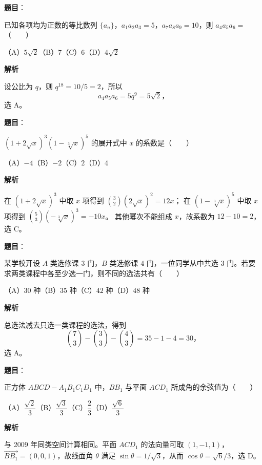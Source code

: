\begin{answer}

\textbf{题目}：

已知各项均为正数的等比数列 $\{a_n\}$，$a_1a_2a_3=5$，$a_7a_8a_9=10$，则 $a_4a_5a_6=$\mbox{（　　）}

（A）$5\sqrt2$\quad（B）$7$\quad（C）$6$\quad（D）$4\sqrt2$

\textbf{解析}

设公比为 $q$，则 $q^{18}=10/5=2$，所以
\nopagebreak[4]
\[
a_4a_5a_6=5q^9=5\sqrt2\text{，}
\]
选 A。


\end{answer}
\begin{answer}

\textbf{题目}：

$(1+2\sqrt{x})^3(1-\sqrt[3]{x})^5$ 的展开式中 $x$ 的系数是\mbox{（　　）}

（A）$-4$\quad（B）$-2$\quad（C）$2$\quad（D）$4$

\textbf{解析}

在 $(1+2\sqrt{x})^3$ 中取 $x$ 项得到 $\binom32(2\sqrt{x})^2=12x$；
在 $(1-\sqrt[3]{x})^5$ 中取 $x$ 项得到 $\binom53(-\sqrt[3]{x})^3=-10x$。
其他幂次不能组成 $x$，故系数为 $12-10=2$，选 C。


\end{answer}
\begin{answer}

\textbf{题目}：

某学校开设 $A$ 类选修课 $3$ 门，$B$ 类选修课 $4$ 门，一位同学从中共选 $3$ 门。若要求两类课程中各至少选一门，则不同的选法共有\mbox{（　　）}

（A）$30$ 种\quad（B）$35$ 种\quad（C）$42$ 种\quad（D）$48$ 种

\textbf{解析}

总选法减去只选一类课程的选法，得到
\nopagebreak[4]
\[
\binom73-\binom33-\binom43=35-1-4=30\text{，}
\]
选 A。


\end{answer}
\begin{answer}

\textbf{题目}：

正方体 $ABCD-A_1B_1C_1D_1$ 中，$BB_1$ 与平面 $ACD_1$ 所成角的余弦值为\mbox{（　　）}

（A）$\dfrac{\sqrt2}{3}$\quad（B）$\dfrac{\sqrt3}{3}$\quad（C）$\dfrac23$\quad（D）$\dfrac{\sqrt6}{3}$

\textbf{解析}

与 2009 年同类空间计算相同。平面 $ACD_1$ 的法向量可取 $(1,-1,1)$，
$\overrightarrow{BB_1}=(0,0,1)$，故线面角 $\theta$ 满足
$\sin\theta=1/\sqrt3$，从而 $\cos\theta=\sqrt6/3$，选 D。


\end{answer}
